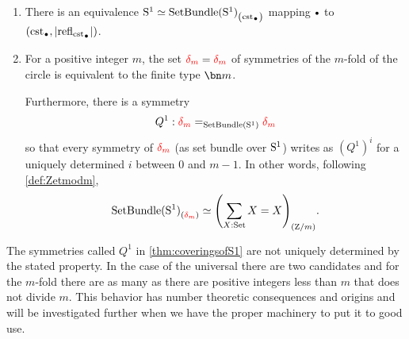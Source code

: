 \begin{theorem}~%
  \label{thm:coveringsofS1}
  \begin{enumerate}
  \item \label{item:univ-cover-Sc-Z}%
    There is an equivalence
    $\Sc \weq \conncomp {\SetBundle(\Sc)} {\cst \base}$ mapping
    $\base$ to $(\cst \base, \trunc{\refl {\cst \base}})$.
    

  \item \label{item:setbundle-mcover}%
    For a positive integer $m$, the set
    $\dg{m}=\dg{m}$ of symmetries of the
    $m$-fold \covering of the circle is equivalent to the finite type
    $\bn m$.

    Furthermore, there is a symmetry
    \begin{displaymath}
      Q^1:\dg{m}=_{\SetBundle(\Sc)}\dg{m}
    \end{displaymath}
    so that every symmetry of $\dg{m}$ (as set bundle over
    ${\mathrm{S}^1}$) writes as $(Q^1)^i$ for a uniquely determined $i$ between
    $0$ and $m-1$. In other words, following \cref{def:Zetmodm},
    \begin{displaymath}
      \conncomp{\SetBundle(\Sc)}{\dg{m}} \weq \conncomp{\left(\sum_{X:\Set}X=X\right)}{\zet/m}.
    \end{displaymath}

  \end{enumerate}
 \end{theorem}
\begin{remark}\label{rem:thenonuniquenessofgeneratorsofmodulararithmetic1}
  The symmetries called $Q^1$ in \cref{thm:coveringsofS1} are not
  uniquely determined by the stated property.  In the case of the
  universal \covering there are two candidates and for the $m$-fold
  \covering there are as many as there are positive integers less than
  $m$ that does not divide $m$.  This behavior has number theoretic
  consequences and origins and will be investigated further when we
  have the proper machinery to put it to good use.
\end{remark}

